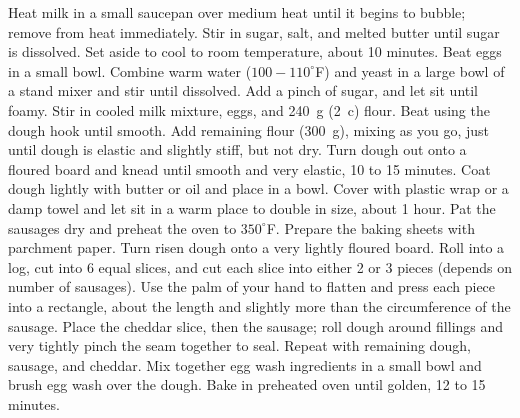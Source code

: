 \begin{recipe}
    \preparation
    {
        \step Heat milk in a small saucepan over medium heat until it begins to bubble; remove from heat immediately. Stir in sugar, salt, and melted butter until sugar is dissolved. Set aside to cool to room temperature, about 10 minutes. 
		\step Beat eggs in a small bowl. Combine warm water ($100-110^{\circ}$F) and yeast in a large bowl of a stand mixer and stir until dissolved. Add a pinch of sugar, and let sit until foamy. 
		\step Stir in cooled milk mixture, eggs, and 240~g (2~c) flour. Beat using the dough hook until smooth. Add remaining flour (300~g), mixing as you go, just until dough is elastic and slightly stiff, but not dry. 
		\step Turn dough out onto a floured board and knead until smooth and very elastic, 10 to 15 minutes. Coat dough lightly with butter or oil and place in a bowl. Cover with plastic wrap or a damp towel and let sit in a warm place to double in size, about 1 hour. 
		\step Pat the sausages dry and preheat the oven to $350^{\circ}$F. Prepare the baking sheets with parchment paper. 
		\step Turn risen dough onto a very lightly floured board. Roll into a log, cut into 6 equal slices, and cut each slice into either 2 or 3 pieces (depends on number of sausages). 
		\step Use the palm of your hand to flatten and press each piece into a rectangle, about the length and slightly more than the circumference of the sausage. Place the cheddar slice, then the sausage; roll dough around fillings and very tightly pinch the seam together to seal. Repeat with remaining dough, sausage, and cheddar. 
		\step Mix together egg wash ingredients in a small bowl and brush egg wash over the dough. Bake in preheated oven until golden, 12 to 15 minutes. 
    }
	

\end{recipe}
